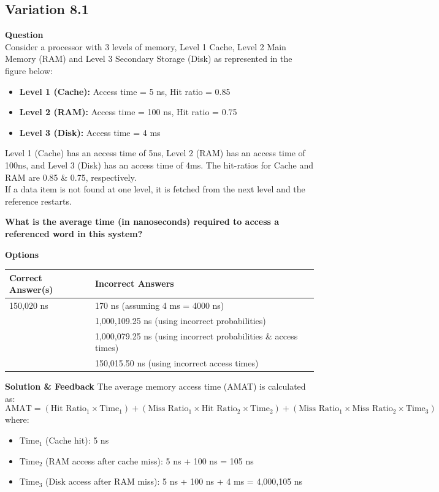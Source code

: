 \subsection{Variation 8.1}
\textbf{Question}\\
Consider a processor with 3 levels of memory, Level 1 Cache, Level 2 Main Memory (RAM) and Level 3 Secondary Storage (Disk) as represented in the figure below:\\
\begin{itemize}
    \item \textbf{Level 1 (Cache):} Access time = 5 ns, Hit ratio = 0.85
    \item \textbf{Level 2 (RAM):} Access time = 100 ns, Hit ratio = 0.75
    \item \textbf{Level 3 (Disk):} Access time = 4 ms
\end{itemize}
Level 1 (Cache) has an access time of 5ns, Level 2 (RAM) has an access time of 100ns, and Level 3 (Disk) has an access time of 4ms. The hit-ratios for Cache and RAM are 0.85 \& 0.75, respectively. \\

If a data item is not found at one level, it is fetched from the next level and the reference restarts. 

\noindent \textbf{What is the average time (in nanoseconds) required to access a referenced word in this system?}

\textbf{Options}
\begin{tabular}{ll}
    \textbf{Correct Answer(s)} & \textbf{Incorrect Answers} \\
    \hline
    150,020 ns & 170 ns (assuming 4 ms = 4000 ns) \\
    & 1,000,109.25 ns (using incorrect probabilities) \\
    & 1,000,079.25 ns (using incorrect probabilities \& access times) \\
    & 150,015.50 ns (using incorrect access times) \\
\end{tabular}

\textbf{Solution \& Feedback}
The average memory access time (AMAT) is calculated as:
\[
\text{AMAT} = (\text{Hit Ratio}_1 \times \text{Time}_1) + (\text{Miss Ratio}_1 \times \text{Hit Ratio}_2 \times \text{Time}_2) + (\text{Miss Ratio}_1 \times \text{Miss Ratio}_2 \times \text{Time}_3)
\]
where:
\begin{itemize}
    \item $\text{Time}_1$ (Cache hit): 5 ns
    \item $\text{Time}_2$ (RAM access after cache miss): 5 ns + 100 ns = 105 ns
    \item $\text{Time}_3$ (Disk access after RAM miss): 5 ns + 100 ns + 4 ms = 4,000,105 ns
\end{itemize}

